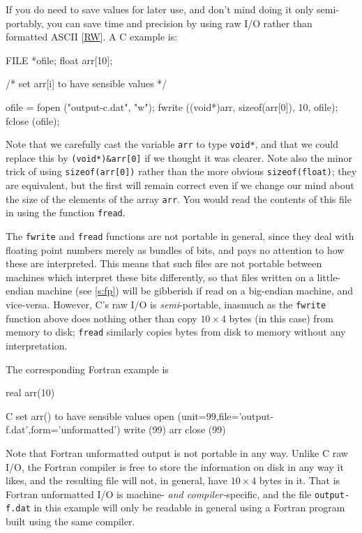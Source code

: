 \documentclass[11pt,oneside,chapters]{starlink}
\begin{document}
If you do need to save values for later use, and don't
mind doing it only semi-portably, you can save time and
precision by using raw I/O rather than formatted ASCII
[\hyperlink{ta:rw}{RW}].
A C example is:

\begin{terminalv}
FILE *ofile; float arr[10];

/* set arr[i] to have sensible values */

ofile = fopen ("output-c.dat", "w");
fwrite ((void*)arr, sizeof(arr[0]), 10, ofile);
fclose (ofile);
\end{terminalv}

Note that we carefully cast the variable
\texttt{arr} to type \texttt{void*}, and that we
could replace this by \texttt{(void*)\&arr[0]} if
we thought it was clearer.  Note also the minor trick of
using \texttt{sizeof(arr[0])} rather than the more
obvious \texttt{sizeof(float)}; they are equivalent,
but the first will remain correct even if we change our
mind about the size of the elements of the array
\texttt{arr}.  You would read the contents of this
file in using the function \texttt{fread}.

The \texttt{fwrite} and \texttt{fread}
functions are not portable in general, since they deal
with floating point numbers merely as bundles of bits,
and pays no attention to how these are interpreted.
This means that such files are not portable between
machines which interpret these bits differently, so that
files written on a little-endian machine (see \ref{s:fp})
will be gibberish if read on a big-endian
machine, and vice-versa.  However, C's raw I/O is
\emph{semi}-portable, inasmuch as the
\texttt{fwrite} function above does nothing other
than copy $10\times4$ bytes
(in this case) from memory to disk; \texttt{fread}
similarly copies bytes from disk to memory without any
interpretation.

The corresponding Fortran example is

\begin{terminalv}
      real arr(10)

C     set arr() to have sensible values
      open (unit=99,file='output-f.dat',form='unformatted')
      write (99) arr
      close (99)
\end{terminalv}

Note that Fortran unformatted output is not portable in
any way.  Unlike C raw I/O, the Fortran compiler is free
to store the information on disk in any way it likes,
and the resulting file will not, in general, have
$10\times4$ bytes in it.  That
is Fortran unformatted I/O is machine- \emph{and compiler-}specific,
and the file
\texttt{output-f.dat} in this example will only be
readable in general using a Fortran program built using
the same compiler.
\end{document}
